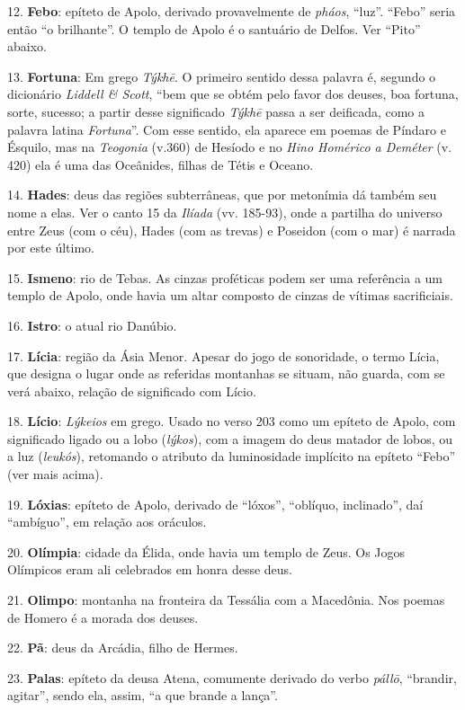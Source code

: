 12. \textbf{Febo}: epíteto de Apolo, derivado provavelmente de
\emph{pháos}, ``luz''. ``Febo'' seria então ``o brilhante''. O templo de
Apolo é o santuário de Delfos. Ver ``Pito'' abaixo.

13. \textbf{Fortuna}: Em grego \emph{Týkhē}. O primeiro sentido dessa
palavra é, segundo o dicionário \emph{Liddell \& Scott}, ``bem que se
obtém pelo favor dos deuses, boa fortuna, sorte, sucesso; a partir desse
significado \emph{Týkhē} passa a ser deificada, como a palavra latina
\emph{Fortuna}''. Com esse sentido, ela aparece em poemas de Píndaro e
Ésquilo, mas na \emph{Teogonia} (v.360) de Hesíodo e no \emph{Hino
Homérico a Deméter} (v. 420) ela é uma das Oceânides, filhas de Tétis e
Oceano.

14. \textbf{Hades}: deus das regiões subterrâneas, que por metonímia dá
também seu nome a elas. Ver o canto 15 da \emph{Ilíada} (vv. 185-93),
onde a partilha do universo entre Zeus (com o céu), Hades (com as
trevas) e Poseidon (com o mar) é narrada por este último.

15. \textbf{Ismeno}: rio de Tebas. As cinzas proféticas podem ser uma
referência a um templo de Apolo, onde havia um altar composto de cinzas
de vítimas sacrificiais.

16. \textbf{Istro}: o atual rio Danúbio.

17. \textbf{Lícia}: região da Ásia Menor. Apesar do jogo de sonoridade,
o termo Lícia, que designa o lugar onde as referidas montanhas se
situam, não guarda, com se verá abaixo, relação de significado com
Lício.

18. \textbf{Lício}: \emph{Lýkeios} em grego. Usado no verso 203 como um
epíteto de Apolo, com significado ligado ou a lobo (\emph{lýkos}), com a
imagem do deus matador de lobos, ou a luz (\emph{leukós}), retomando o
atributo da luminosidade implícito na epíteto ``Febo'' (ver mais acima).

19. \textbf{Lóxias}: epíteto de Apolo, derivado de ``lóxos'', ``oblíquo,
inclinado'', daí ``ambíguo'', em relação aos oráculos.

20. \textbf{Olímpia}: cidade da Élida, onde havia um templo de Zeus. Os
Jogos Olímpicos eram ali celebrados em honra desse deus.

21. \textbf{Olimpo}: montanha na fronteira da Tessália com a Macedônia.
Nos poemas de Homero é a morada dos deuses.

22. \textbf{Pã}: deus da Arcádia, filho de Hermes.

23. \textbf{Palas}: epíteto da deusa Atena, comumente derivado do verbo
\emph{pállō}, ``brandir, agitar'', sendo ela, assim, ``a que brande a
lança''.

